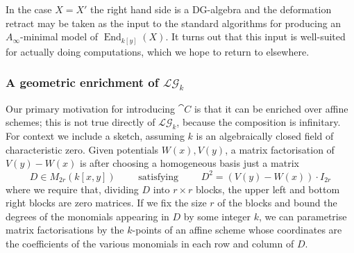 \documentclass[english,letter paper,12pt,leqno]{article}
\theoremstyle{example}
\numberwithin{equation}{section}
\def\LG{\mathcal{LG}}
\def\be{\begin{equation}}
\def\ee{\end{equation}}
\DeclareMathOperator{\End}{End}
\begin{document}
In the case $X = X'$ the right hand side is a DG-algebra and the deformation retract may be taken as the input to the standard algorithms for producing an $A_\infty$-minimal model of $\End_{k[y]}(X)$. It turns out that this input is well-suited for actually doing computations, which we hope to return to elsewhere.

\subsubsection{A geometric enrichment of $\LG_k$}

Our primary motivation for introducing $\cat{C}$ is that it can be enriched over affine schemes; this is not true directly of $\LG_k$, because the composition is infinitary. For context we include a sketch, assuming $k$ is an algebraically closed field of characteristic zero. Given potentials $W(x), V(y)$, a matrix factorisation of $V(y) - W(x)$ is after choosing a homogeneous basis just a matrix
\be\label{eq:intro_capitalD}
D \in M_{2r}( k[x,y] ) \qquad \text{ satisfying } \qquad D^2 = (V(y) - W(x)) \cdot I_{2r}
\ee
where we require that, dividing $D$ into $r \times r$ blocks, the upper left and bottom right blocks are zero matrices. If we fix the size $r$ of the blocks and bound the degrees of the monomials appearing in $D$ by some integer $k$, we can parametrise matrix factorisations by the $k$-points of an affine scheme whose coordinates are the coefficients of the various monomials in each row and column of $D$. 
\end{document}
